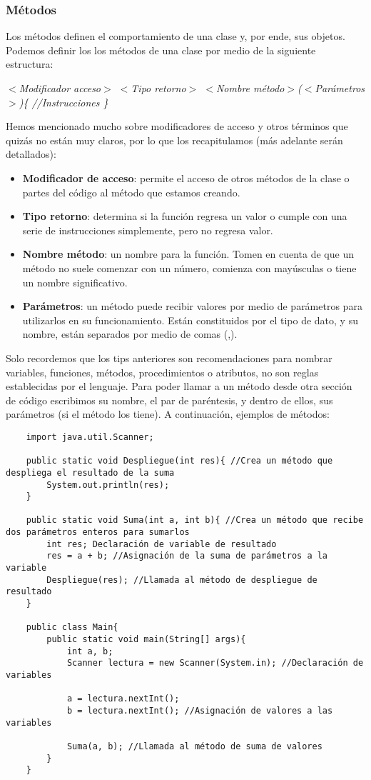 \subsubsection{Métodos}
Los métodos definen el comportamiento de una clase y, por ende, sus objetos. Podemos definir los los métodos de una clase por medio de la siguiente estructura:\begin{center}\textit{$<$Modificador acceso$>$ $<$Tipo retorno$>$ $<$Nombre método$>$($<$Parámetros$>$)\{ //Instrucciones \}}\end{center}
Hemos mencionado mucho sobre modificadores de acceso y otros términos que quizás no están muy claros, por lo que los recapitulamos (más adelante serán detallados):
\begin{itemize}
    \item \textbf{Modificador de acceso}: permite el acceso de otros métodos de la clase o partes del código al método que estamos creando.
    \item \textbf{Tipo retorno}: determina si la función regresa un valor o cumple con una serie de instrucciones simplemente, pero no regresa valor.
    \item \textbf{Nombre método}: un nombre para la función. Tomen en cuenta de que un método no suele comenzar con un número, comienza con mayúsculas o tiene un nombre significativo.
    \item \textbf{Parámetros}: un método puede recibir valores por medio de parámetros para utilizarlos en su funcionamiento. Están constituidos por el tipo de dato, y su nombre, están separados por medio de comas (,).
\end{itemize}
Solo recordemos que los tips anteriores son recomendaciones para nombrar variables, funciones, métodos, procedimientos o atributos, no son reglas establecidas por el lenguaje. Para poder llamar a un método desde otra sección de código escribimos su nombre, el par de paréntesis, y dentro de ellos, sus parámetros (si el método los tiene). A continuación, ejemplos de métodos:
\begin{lstlisting}
    import java.util.Scanner;
    
    public static void Despliegue(int res){ //Crea un método que despliega el resultado de la suma
        System.out.println(res);
    }
    
    public static void Suma(int a, int b){ //Crea un método que recibe dos parámetros enteros para sumarlos
        int res; Declaración de variable de resultado
        res = a + b; //Asignación de la suma de parámetros a la variable
        Despliegue(res); //Llamada al método de despliegue de resultado
    }
    
    public class Main{
        public static void main(String[] args){
            int a, b;
            Scanner lectura = new Scanner(System.in); //Declaración de variables
            
            a = lectura.nextInt();
            b = lectura.nextInt(); //Asignación de valores a las variables
            
            Suma(a, b); //Llamada al método de suma de valores
        }
    }
\end{lstlisting}

